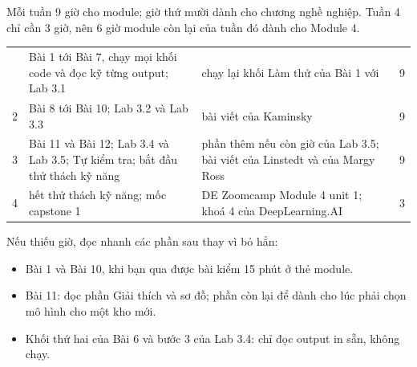 Mỗi tuần 9 giờ cho module; giờ thứ mười dành cho chương nghề nghiệp. Tuần 4 chỉ cần 3 giờ, nên 6 giờ module còn lại của tuần đó dành cho Module 4.

\begin{xltabular}{\textwidth}{@{}P{1.0cm} L P{4.4cm} P{0.8cm}@{}}
\toprule
{} &  &  &  \\
\midrule
\endhead
\bottomrule
{} & Bài 1 tới Bài 7, chạy mọi khối code và đọc kỹ từng output; Lab 3.1 & chạy lại khối Làm thử của Bài 1 với  & 9 \\
2 & Bài 8 tới Bài 10; Lab 3.2 và Lab 3.3 & bài viết của Kaminsky & 9 \\
3 & Bài 11 và Bài 12; Lab 3.4 và Lab 3.5; Tự kiểm tra; bắt đầu thử thách kỹ năng & phần thêm nếu còn giờ của Lab 3.5; bài viết của Linstedt và của Margy Ross & 9 \\
4 & hết thử thách kỹ năng; mốc capstone 1 & DE Zoomcamp Module 4 unit 1; khoá 4 của DeepLearning.AI & 3 \\
\end{xltabular}

Nếu thiếu giờ, đọc nhanh các phần sau thay vì bỏ hẳn:
\begin{itemize}
  \item Bài 1 và Bài 10, khi bạn qua được bài kiểm 15 phút ở thẻ module.
  \item Bài 11: đọc phần Giải thích và sơ đồ; phần còn lại để dành cho lúc phải chọn mô hình cho một kho mới.
  \item Khối thứ hai của Bài 6 và bước 3 của Lab 3.4: chỉ đọc output in sẵn, không chạy.
\end{itemize}
